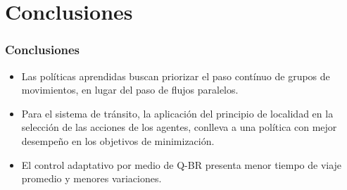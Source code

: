\documentclass[11pt]{beamer}
\begin{document}
\section{Conclusiones}
\begin{frame}
\frametitle{Conclusiones}
\begin{itemize}
\item Las políticas aprendidas buscan priorizar el paso contínuo de grupos de movimientos, en lugar del paso de flujos paralelos.\\
\item Para el sistema de tránsito, la aplicación del principio de localidad en la selección de las acciones de los agentes, conlleva a una política con mejor desempeño en los objetivos de minimización.
\item El control adaptativo por medio de Q-BR presenta menor tiempo de viaje promedio y menores variaciones.
\end{itemize}

\pause

\end{frame}
\end{document}
